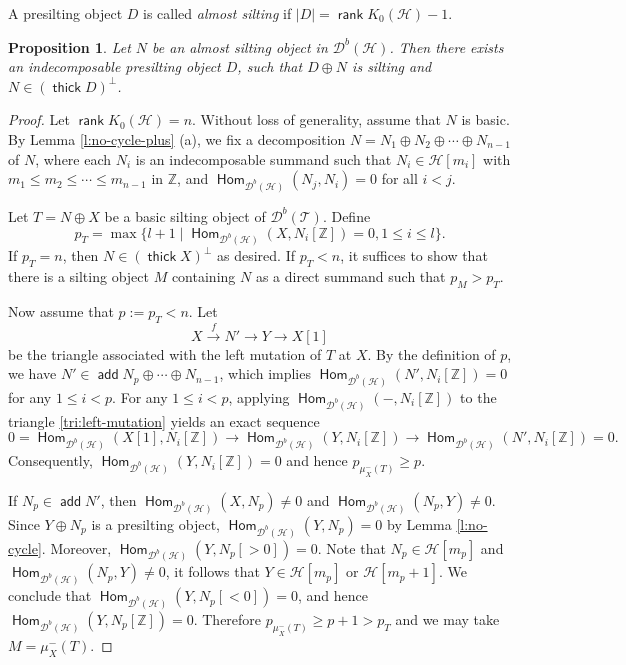 \documentclass[12pt,a4paper,reqno]{amsart}
\newtheorem{proposition}[theorem]{Proposition}
\theoremstyle{definition}
\newcommand{\opname}[1]{\operatorname{\mathsf{#1}}}
\newcommand{\add}{\opname{add}\nolimits}
\newcommand{\der}{\cd}
\newcommand{\rank}{\opname{rank}\nolimits}
\newcommand{\thick}{\opname{thick}}
\newcommand{\Hom}{\opname{Hom}}
\newcommand{\cd}{{\mathcal D}}
\begin{document}
A presilting object $D$ is called \emph{almost silting} if $|D| = \rank K_0(\mathcal{H}) - 1$.
\begin{proposition}\label{p: ind-perp-completion}
Let $N$ be an almost silting object in $\der^b(\mathcal{H})$. Then there exists an indecomposable presilting object $D$, such that $D \oplus N$ is silting and $N \in (\thick D)^\perp$.
\end{proposition}
\begin{proof}
Let $\rank K_0(\mathcal{H})=n$.
Without loss of generality, assume that $N$ is basic. By Lemma \ref{l:no-cycle-plus} (a), we fix a decomposition  $N =  N_1 \oplus N_2 \oplus \cdots \oplus N_{n-1}$ of $N$, where each $N_i$ is an indecomposable summand such that $N_i \in \mathcal{H}[m_i]$ with $m_1 \leq m_2 \leq \cdots \leq m_{n-1}$ in $\mathbb{Z}$, and $\Hom_{\der^b(\mathcal{H})}(N_j, N_i) = 0$ for all $i < j$. 

Let $T=N\oplus X$ be a basic silting object of $\der^b(\mathcal{T})$. Define 
\[
p_T=\max\{l+1 \mid \Hom_{\der^b(\mathcal{H})}(X,N_i[\mathbb{Z}])=0, 1\leq i\leq l\}.
\]
If $p_T=n$, then $N\in (\thick X)^\perp$ as desired.  If $p_T<n$,  it suffices to  show that there is a silting object $M$ containing $N$ as a direct summand such that $p_M>p_T$.

Now assume that $p:=p_T<n$. 
Let 
\begin{equation}\label{tri:left-mutation}
    X\xrightarrow{f} N'\to Y\to X[1]
\end{equation} 
be the triangle associated with the left mutation of $T$ at $X$. By the definition of $p$, we have $N'\in \add N_p\oplus\cdots\oplus N_{n-1}$, which implies $\Hom_{\der^b(\mathcal{H})}(N',N_i[\mathbb{Z}])=0$ for any $1\leq i<p$. For any $1\leq i<p$, applying $\Hom_{\der^b(\mathcal{H})}(-,N_i[\mathbb{Z}])$ to the triangle \eqref{tri:left-mutation} yields an exact sequence
\[
0=\Hom_{\der^b(\mathcal{H})}(X[1],N_i[\mathbb{Z}])\to \Hom_{\der^b(\mathcal{H})}(Y,N_i[\mathbb{Z}])\to \Hom_{\der^b(\mathcal{H})}(N',N_i[\mathbb{Z}])=0.
\]
Consequently, $\Hom_{\der^b(\mathcal{H})}(Y,N_i[\mathbb{Z}])=0$ and hence $p_{\mu_X^-(T)} \geq p$.




If $N_p\in \add N'$, then $\Hom_{\der^b(\mathcal{H})}(X,N_p)\neq 0$ and $\Hom_{\der^b(\mathcal{H})}(N_p,Y)\neq 0$. Since $Y\oplus N_p$ is a presilting object,  $\Hom_{\der^b(\mathcal{H})}(Y,N_p)=0$ by Lemma \ref{l:no-cycle}. Moreover, $\Hom_{\der^b(\mathcal{H})}(Y,N_p[>0])=0$.  Note that $N_p\in \mathcal{H}[m_p]$ and $\Hom_{\der^b(\mathcal{H})}(N_p,Y)\neq 0$, it follows that $Y\in \mathcal{H}[m_p]$ or $\mathcal{H}[m_p+1]$. We conclude that $\Hom_{\der^b(\mathcal{H})}(Y,N_p[<0])=0$, and hence $\Hom_{\der^b(\mathcal{H})}(Y,N_p[\mathbb{Z}])=0$. Therefore $p_{\mu_X^-(T)}\geq p+1>p_T$ and we may take $M=\mu_X^-(T)$.


\end{proof}
\end{document}
